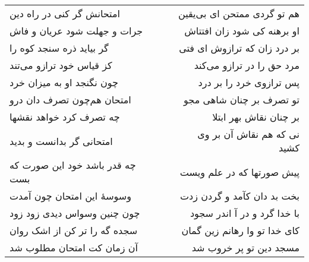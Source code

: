 \begin{center}
\begin{longtable}{l p{0.5cm} r}
\\
امتحانش گر کنی در راه دین
&&
هم تو گردی ممتحن ای بی‌یقین
\\
جرات و جهلت شود عریان و فاش
&&
او برهنه کی شود زان افتتاش
\\
گر بیاید ذره سنجد کوه را
&&
بر درد زان که ترازوش ای فتی
\\
کز قیاس خود ترازو می‌تند
&&
مرد حق را در ترازو می‌کند
\\
چون نگنجد او به میزان خرد
&&
پس ترازوی خرد را بر درد
\\
امتحان هم‌چون تصرف دان درو
&&
تو تصرف بر چنان شاهی مجو
\\
چه تصرف کرد خواهد نقشها
&&
بر چنان نقاش بهر ابتلا
\\
امتحانی گر بدانست و بدید
&&
نی که هم نقاش آن بر وی کشید
\\
چه قدر باشد خود این صورت که بست
&&
پیش صورتها که در علم ویست
\\
وسوسهٔ این امتحان چون آمدت
&&
بخت بد دان کآمد و گردن زدت
\\
چون چنین وسواس دیدی زود زود
&&
با خدا گرد و در آ اندر سجود
\\
سجده گه را تر کن از اشک روان
&&
کای خدا تو وا رهانم زین گمان
\\
آن زمان کت امتحان مطلوب شد
&&
مسجد دین تو پر خروب شد
\\
\end{longtable}
\end{center}
